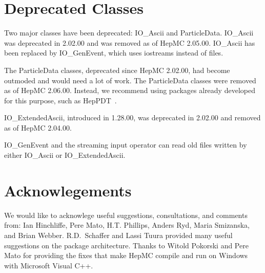 \documentclass[11pt,letterpaper]{article}
\begin{document}
\clearpage

%
%

\section{Deprecated Classes}
\label{deprecated}

Two major classes have been deprecated: IO\_Ascii and ParticleData.
IO\_Ascii was deprecated in 2.02.00 and was removed as of HepMC 2.05.00.
IO\_Ascii has been replaced by IO\_GenEvent, 
which uses iostreams instead of files.

The ParticleData classes, deprecated since HepMC 2.02.00, 
had become outmoded and would need a lot of work.  
The ParticleData classes were removed as of HepMC 2.06.00.
Instead, we recommend using packages already developed for this
purpose, such as HepPDT~\cite{heppdt}.

IO\_ExtendedAscii, introduced in 1.28.00, was deprecated in 2.02.00 
and removed as of HepMC 2.04.00.

IO\_GenEvent and the streaming input operator can read old files written by 
either IO\_Ascii or IO\_ExtendedAscii.


%
%

\section{Acknowlegements}

We would like to acknowlege useful suggestions, consultations, and
comments from: Ian Hinchliffe, Pere Mato, H.T. Phillips, Anders Ryd,
Maria Smizanska, and Brian Webber.  R.D.\ Schaffer and Lassi
Tuura provided many useful suggestions on the package architecture.
Thanks to Witold Pokorski and Pere Mato for providing the fixes that
make HepMC compile and run on Windows with Microsoft Visual C++.


%
%
\end{document}
